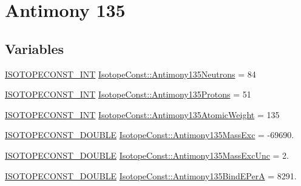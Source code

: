 \hypertarget{group___isotope_const-_antimony-_sb135}{}\section{Antimony 135}
\label{group___isotope_const-_antimony-_sb135}
\subsection*{Variables}
\begin{DoxyCompactItemize}
\item 
\mbox{\hyperlink{group___isotope_const-_macros_ga5f18360b3e99483a35c32d789e62621c}{I\+S\+O\+T\+O\+P\+E\+C\+O\+N\+S\+T\+\_\+\+I\+NT}} \mbox{\hyperlink{group___isotope_const-_antimony-_sb135_ga72fcdbc749edee8117d3cca80ec60eac}{Isotope\+Const\+::\+Antimony135\+Neutrons}} = 84
\item 
\mbox{\hyperlink{group___isotope_const-_macros_ga5f18360b3e99483a35c32d789e62621c}{I\+S\+O\+T\+O\+P\+E\+C\+O\+N\+S\+T\+\_\+\+I\+NT}} \mbox{\hyperlink{group___isotope_const-_antimony-_sb135_ga74078ec106dd519274c69bb066eca195}{Isotope\+Const\+::\+Antimony135\+Protons}} = 51
\item 
\mbox{\hyperlink{group___isotope_const-_macros_ga5f18360b3e99483a35c32d789e62621c}{I\+S\+O\+T\+O\+P\+E\+C\+O\+N\+S\+T\+\_\+\+I\+NT}} \mbox{\hyperlink{group___isotope_const-_antimony-_sb135_ga161e2316e483a482d87fed4866819d2d}{Isotope\+Const\+::\+Antimony135\+Atomic\+Weight}} = 135
\item 
\mbox{\hyperlink{group___isotope_const-_macros_ga8f45a7272ce02c0b4c65c44636ed719a}{I\+S\+O\+T\+O\+P\+E\+C\+O\+N\+S\+T\+\_\+\+D\+O\+U\+B\+LE}} \mbox{\hyperlink{group___isotope_const-_antimony-_sb135_gad48e14a62c409bd0fabdd59a374fe9ca}{Isotope\+Const\+::\+Antimony135\+Mass\+Exc}} = -\/69690.
\item 
\mbox{\hyperlink{group___isotope_const-_macros_ga8f45a7272ce02c0b4c65c44636ed719a}{I\+S\+O\+T\+O\+P\+E\+C\+O\+N\+S\+T\+\_\+\+D\+O\+U\+B\+LE}} \mbox{\hyperlink{group___isotope_const-_antimony-_sb135_gac4ac22496c40a131a6e6072016207cf6}{Isotope\+Const\+::\+Antimony135\+Mass\+Exc\+Unc}} = 2.
\item 
\mbox{\hyperlink{group___isotope_const-_macros_ga8f45a7272ce02c0b4c65c44636ed719a}{I\+S\+O\+T\+O\+P\+E\+C\+O\+N\+S\+T\+\_\+\+D\+O\+U\+B\+LE}} \mbox{\hyperlink{group___isotope_const-_antimony-_sb135_ga757ddfe3675b5d7753b4ac89871b84e8}{Isotope\+Const\+::\+Antimony135\+Bind\+E\+PerA}} = 8291.
\item 

\end{DoxyCompactItemize}
